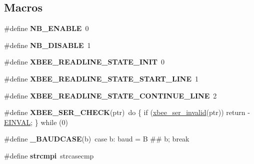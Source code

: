 \subsection*{Macros}
\begin{DoxyCompactItemize}
\item 
\hypertarget{group__hal__posix_ga3fb2b4e9c5df4d26c14bfcd77eded216}{\#define {\bfseries N\-B\-\_\-\-E\-N\-A\-B\-L\-E}~0}\label{group__hal__posix_ga3fb2b4e9c5df4d26c14bfcd77eded216}

\item 
\hypertarget{group__hal__posix_ga41927446ed98bfbdcdb72ec0906f413d}{\#define {\bfseries N\-B\-\_\-\-D\-I\-S\-A\-B\-L\-E}~1}\label{group__hal__posix_ga41927446ed98bfbdcdb72ec0906f413d}

\item 
\hypertarget{group__hal__posix_ga029adc5ad3f556e4c5671b21529c0dd1}{\#define {\bfseries X\-B\-E\-E\-\_\-\-R\-E\-A\-D\-L\-I\-N\-E\-\_\-\-S\-T\-A\-T\-E\-\_\-\-I\-N\-I\-T}~0}\label{group__hal__posix_ga029adc5ad3f556e4c5671b21529c0dd1}

\item 
\hypertarget{group__hal__posix_gaa3a6d3307bf92060ea7c2664dc9e7b6b}{\#define {\bfseries X\-B\-E\-E\-\_\-\-R\-E\-A\-D\-L\-I\-N\-E\-\_\-\-S\-T\-A\-T\-E\-\_\-\-S\-T\-A\-R\-T\-\_\-\-L\-I\-N\-E}~1}\label{group__hal__posix_gaa3a6d3307bf92060ea7c2664dc9e7b6b}

\item 
\hypertarget{group__hal__posix_ga5eb45373870b820af1c6c5d2918ee9c1}{\#define {\bfseries X\-B\-E\-E\-\_\-\-R\-E\-A\-D\-L\-I\-N\-E\-\_\-\-S\-T\-A\-T\-E\-\_\-\-C\-O\-N\-T\-I\-N\-U\-E\-\_\-\-L\-I\-N\-E}~2}\label{group__hal__posix_ga5eb45373870b820af1c6c5d2918ee9c1}

\item 
\hypertarget{group__hal__posix_ga755b7e850db6200a6f43b741c678ae53}{\#define {\bfseries X\-B\-E\-E\-\_\-\-S\-E\-R\-\_\-\-C\-H\-E\-C\-K}(ptr)~do \{ if (\hyperlink{group__xbee__serial_gae7f838b59f553507bf81a86042fe9cd7}{xbee\-\_\-ser\-\_\-invalid}(ptr)) return -\/\hyperlink{group__hal_ga2d1678d5a7cc8ce499643f3b8957def4}{E\-I\-N\-V\-A\-L}; \} while (0)}\label{group__hal__posix_ga755b7e850db6200a6f43b741c678ae53}

\item 
\hypertarget{group__hal__posix_ga83470a31d4cbec51bad9537a7a1f20b8}{\#define {\bfseries \-\_\-\-B\-A\-U\-D\-C\-A\-S\-E}(b)~case b\-: baud = B \#\# b; break}\label{group__hal__posix_ga83470a31d4cbec51bad9537a7a1f20b8}

\item 
\hypertarget{group__hal__posix_gacf1a32c487efc5306d57219a57d57b60}{\#define {\bfseries strcmpi}~strcasecmp}\label{group__hal__posix_gacf1a32c487efc5306d57219a57d57b60}


\end{DoxyCompactItemize}
